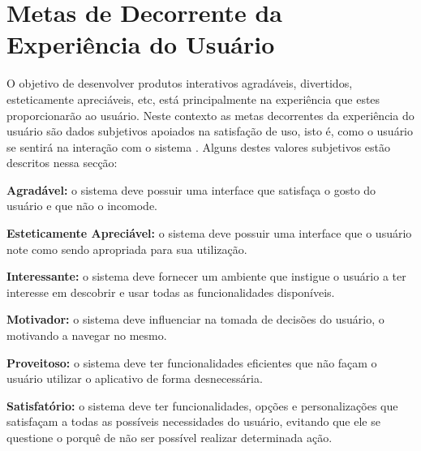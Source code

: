 \chapter[Metas Decorrente da Experiência do Usuário]{Metas de Decorrente da Experiência do Usuário}

O objetivo de desenvolver produtos interativos agradáveis, divertidos, esteticamente apreciáveis, etc, está principalmente na experiência que estes proporcionarão ao usuário. Neste contexto as metas decorrentes da experiência do usuário são dados subjetivos apoiados na satisfação de uso,  isto é, como o usuário se sentirá na interação com o sistema \cite{SHROPR}. Alguns destes valores subjetivos estão descritos nessa secção:

\hspace{1.3cm}
\textbf{Agradável:} o sistema deve possuir uma interface que satisfaça o gosto do usuário e que não o incomode.

\hspace{1.3cm}
\textbf{Esteticamente Apreciável:} o sistema deve possuir uma interface que o usuário note como sendo apropriada para sua utilização.

\hspace{1.3cm}
\textbf{Interessante:} o sistema deve fornecer um ambiente que instigue o usuário a ter interesse em descobrir e usar todas as funcionalidades disponíveis.

\hspace{1.3cm}
\textbf{Motivador:} o sistema deve influenciar na tomada de decisões do usuário, o motivando a navegar no mesmo.

\hspace{1.3cm}
\textbf{Proveitoso:} o sistema deve ter funcionalidades eficientes que não façam o usuário utilizar o aplicativo de forma desnecessária.

\hspace{1.3cm}
\textbf{Satisfatório:} o sistema deve ter funcionalidades, opções e personalizações que satisfaçam a todas as possíveis necessidades do usuário, evitando que ele se questione o porquê de não ser possível realizar determinada ação.